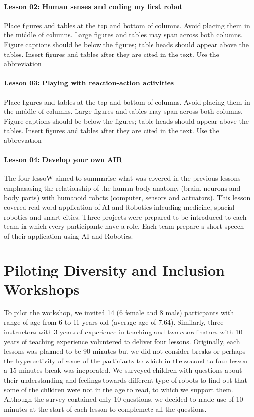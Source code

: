 \documentclass[conference]{IEEEtran}
\begin{document}
\paragraph{Lesson 02: Human senses and coding my first robot} 
Place figures and tables at the top and bottom of columns. Avoid placing them in the middle of columns. 
Large figures and tables may span across both columns. Figure captions should be below the figures; table heads should appear above the tables. 
Insert figures and tables after they are cited in the text. Use the abbreviation 

\paragraph{Lesson 03: Playing with reaction-action activities} 
Place figures and tables at the top and bottom of columns. Avoid placing them in the middle of columns. 
Large figures and tables may span across both columns. Figure captions should be below the figures; table heads should appear above the tables. 
Insert figures and tables after they are cited in the text. Use the abbreviation 

\paragraph{Lesson 04: Develop your own AIR}
The four lessoW aimed to summarise what was covered in the previous lessons emphasasing the relationship of the human body anatomy (brain, neurons and body parts) with humanoid robots (computer, sensors and actuators).
This lesson covered real-word application of AI and Robotics inlcuding medicine, spacial robotics and smart cities. 
Three projects were prepared to be introduced to each team in which every participante have a role. 
Each team prepare a short speech of their application using AI and Robotics. 

\section{Piloting Diversity and Inclusion Workshops}
To pilot the workshop, we invited 14 (6 female and 8 male) particpants with range of age from 6 to 11 years old (average age of 7.64).
Similarly, three instructors with 3 years of experience in teaching and two coordinators with 10 years of teaching experience voluntered to deliver four lessons.
Originally, each lessons was planned to be 90 minutes but we did not consider breaks or perhaps the hyperactivity of some of the particiants to which in the socond to four lesson a 15 minutes break was incporated.
We surveyed children with questions about their understanding and feelings towards different type of robots to find out that some of the children were not in the age to read, to which we support them. 
Although the survey contained only 10 questions, we decided to made use of 10 minutes at the start of each lesson to complemete all the questions.
\end{document}
